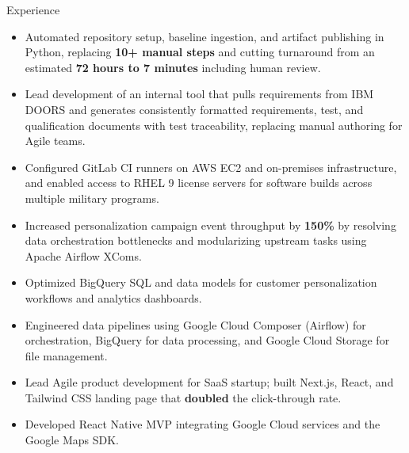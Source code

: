 \begin{rSection}{Experience}
    \begin{itemize}
        \item Automated repository setup, baseline ingestion, and artifact publishing in Python, replacing \textbf{10+ manual steps} and cutting turnaround from an estimated \textbf{72 hours to 7 minutes} including human review.
        \item Lead development of an internal tool that pulls requirements from IBM DOORS and generates consistently formatted requirements, test, and qualification documents with test traceability, replacing manual authoring for Agile teams.
        \item Configured GitLab CI runners on AWS EC2 and on-premises infrastructure, and enabled access to RHEL 9 license servers for software builds across multiple military programs.

    \end{itemize}

    \entrygap
    \begin{itemize}
        \item Increased personalization campaign event throughput
              by \textbf{150\%} by resolving data orchestration
              bottlenecks and modularizing upstream tasks using
              Apache Airflow XComs.
        \item Optimized BigQuery SQL and data models for customer personalization workflows and analytics dashboards.
        \item Engineered data pipelines using Google Cloud Composer (Airflow) for orchestration, BigQuery for data processing, and Google Cloud Storage for file management.
    \end{itemize}

    \entrygap
    \begin{itemize}
        \item Lead Agile product development for SaaS startup; built Next.js, React, and Tailwind CSS landing page that \textbf{doubled} the click-through rate.
        \item Developed React Native MVP integrating Google Cloud services and the Google Maps SDK.
    \end{itemize}

\end{rSection}
